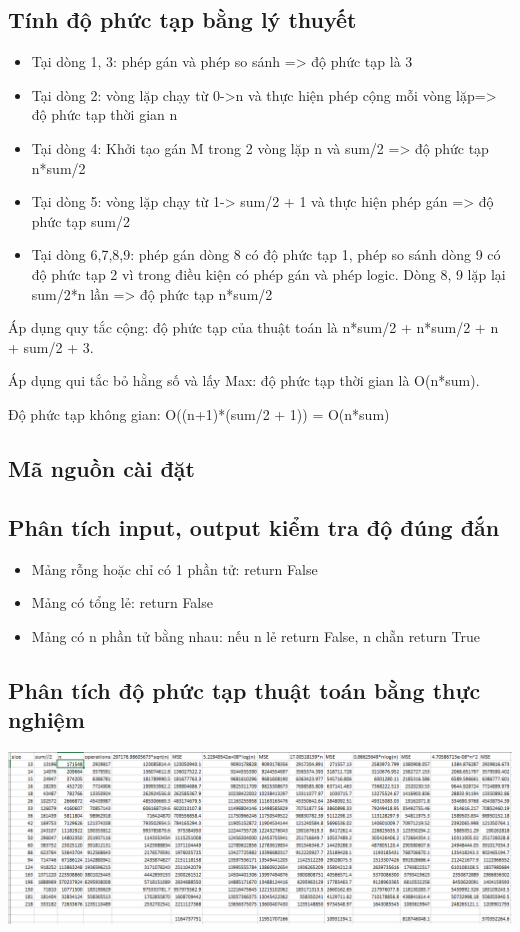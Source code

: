 \documentclass[12pt, letterpaper]{article}
\begin{document}
\subsection{Tính độ phức tạp bằng lý thuyết}
\begin{itemize}
    \item Tại dòng 1, 3: phép gán và phép so sánh => độ phức tạp là 3
    \item Tại dòng 2: vòng lặp chạy từ 0->n  và thực hiện phép cộng mỗi vòng lặp=> độ phức tạp thời gian n
    \item Tại dòng 4: Khởi tạo gán M trong 2 vòng lặp n và sum/2 => độ phức tạp n*sum/2
    \item Tại dòng 5: vòng lặp chạy từ 1-> sum/2 + 1 và thực hiện phép gán => độ phức tạp sum/2
    \item Tại dòng 6,7,8,9: phép gán dòng 8 có độ phức tạp 1, phép so sánh dòng 9 có độ phức tạp 2 vì trong điều kiện có phép gán và phép logic. Dòng 8, 9 lặp lại sum/2*n lần => độ phức tạp n*sum/2 
    
\end{itemize}
Áp dụng quy tắc cộng: độ phức tạp của thuật toán là  n*sum/2 + n*sum/2 + n + sum/2 + 3.

\noindent Áp dụng qui tắc bỏ hằng số và lấy Max: độ phức tạp thời gian là O(n*sum).

\noindent Độ phức tạp không gian: O((n+1)*(sum/2 + 1)) = O(n*sum)
\subsection{Mã nguồn cài đặt}
\subsection{Phân tích input, output kiểm tra độ đúng đắn}
\begin{itemize}
    \item Mảng rỗng hoặc chỉ có 1 phần tử: return False
    \item Mảng có tổng lẻ: return False
    \item Mảng có n phần tử bằng nhau: nếu n lẻ return False, n chẵn return True
\end{itemize}
\subsection{Phân tích độ phức tạp thuật toán bằng thực nghiệm}
\noindent \includegraphics[width=\textwidth,height=\textheight,keepaspectratio]{bang.png}
\end{document}
